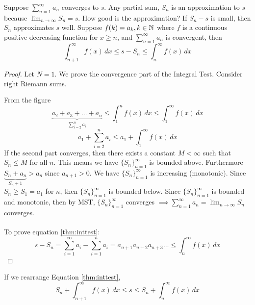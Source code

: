\documentclass[english, 12pt]{article}
\begin{document}
\begin{thrm}
Suppose $\sum_{n=1}^\infty a_{n}$ converges to $s$. Any partial sum, $S_{n}$ is an approximation to $s$ because $\lim_{n\to\infty} S_{n} = s$. How good is the approximation? If $S_{n} - s$ is small, then $S_{n}$ approximates $s$ well.\n
Suppose $f(k) = a_{k}, k \in {\mathbb{N}}$ where $f$ is a continuous positive decreasing function for $x \geq n$, and $\sum_{n=1}^\infty a_{n}$ is convergent, then
\begin{equation}\label{thm:inttest}
\int_{n+1}^\infty f(x)\,dx \leq s - S_{n} \leq \int_{n}^\infty f(x)\,dx
\end{equation}
\begin{proof}
Let $N=1$. We prove the convergence part of the Integral Test. Consider right Riemann sums.
From the figure
\[\underbrace{a_{2} + a_{3} + \dots + a_{n}}_{\sum_{i=2}^n a_{i}} \leq \int_1^n f(x)\,dx \leq \int_1^\infty f(x)\,dx \]
\[a_{1} + \sum_{i=2}^n a_{i} \leq a_{1} + \int_1^\infty f(x)\,dx \]
If the second part converges, then there exists a constant $M< \infty$ such that $S_{n} \leq M$ for all $n$. This means we have $\{S_{n}\}_{n=1}^\infty$ is bounded above. Furthermore $\underbrace{S_{n} + a_{n}}_{S_{n}+1} > a_{n}$ since $a_{n+1} > 0$.
We have $\{S_{n}\}_{n=1}^\infty$ is increasing (monotonic). Since $S_{n} \geq S_{1} = a_{1}$ for $n$, then $\{S_{n}\}_{n=1}^\infty$ is bounded below. Since $\{S_{n}\}_{n=1}^\infty$ is bounded and monotonic, then by MST, $\{S_{n}\}_{n=1}^\infty$ converges $\implies \sum_{n=1}^\infty a_{n} = \lim_{n\to\infty} S_{n}$ converges.\\\\
To prove equation \ref{thm:inttest}:
\[s-S_{n} = \sum_{i=1}^\infty a_{i} - \sum_{i=1}^n a_{i} = a_{n+1} a_{n+2} a_{n+3} \dots \leq \int_n^\infty f(x)\,dx \]
\end{proof}
\end{thrm}
\begin{rem}
If we rearrange Equation \ref{thm:inttest},
\[ S_{n} + \int_{n+1}^\infty f(x)\,dx \leq s \leq S_{n} + \int_{n}^\infty f(x)\,dx \]
\end{rem}
\end{document}
